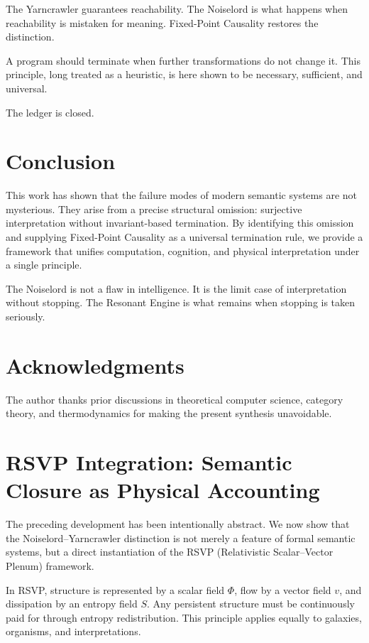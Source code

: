 \documentclass[12pt]{article}
\theoremstyle{remark}
\begin{document}
The Yarncrawler guarantees reachability. The Noiselord is what happens when reachability is mistaken for meaning. Fixed-Point Causality restores the distinction.

A program should terminate when further transformations do not change it. This principle, long treated as a heuristic, is here shown to be necessary, sufficient, and universal.

The ledger is closed.

\section{Conclusion}

This work has shown that the failure modes of modern semantic systems are not mysterious. They arise from a precise structural omission: surjective interpretation without invariant-based termination. By identifying this omission and supplying Fixed-Point Causality as a universal termination rule, we provide a framework that unifies computation, cognition, and physical interpretation under a single principle.

The Noiselord is not a flaw in intelligence. It is the limit case of interpretation without stopping. The Resonant Engine is what remains when stopping is taken seriously.

\section*{Acknowledgments}

The author thanks prior discussions in theoretical computer science, category theory, and thermodynamics for making the present synthesis unavoidable.

\appendix

\section{RSVP Integration: Semantic Closure as Physical Accounting}

The preceding development has been intentionally abstract. We now show that the Noiselord--Yarncrawler distinction is not merely a feature of formal semantic systems, but a direct instantiation of the RSVP (Relativistic Scalar--Vector Plenum) framework.

In RSVP, structure is represented by a scalar field $\Phi$, flow by a vector field $v$, and dissipation by an entropy field $S$. Any persistent structure must be continuously paid for through entropy redistribution. This principle applies equally to galaxies, organisms, and interpretations.
\end{document}
